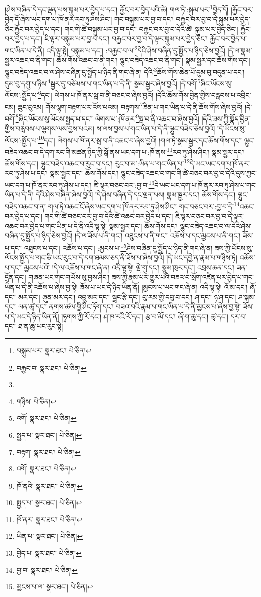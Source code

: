 །ཤེས་བཞིན་དེ་དང་ལྡན་པས་སྐུམ་པར་བྱེད་པ་དང་། རྐྱོང་བར་བྱེད་པའི་ཚེ། གལ་ཏེ་:སྐུམ་པར་\footnote{བསྐུམ་པར་  སྣར་ཐང་།  པེ་ཅིན། }བྱེད་དོ། །རྐྱོང་བར་བྱེད་དོ་ཞེས་ཡང་དག་པ་ཁོ་ནར་རབ་ཏུ་ཤེས་ཤིང་། གང་བསྐུམ་པར་བྱ་བ་དང་། བརྐྱང་བར་བྱ་བ་དེ་སྐུམ་པར་བྱེད་ཅིང་རྐྱོང་བར་བྱེད་པ་དང་། གང་གི་ཚེ་བསྐུམ་པར་བྱ་བ་དང་། བརྐྱང་བར་བྱ་བ་དེའི་ཚེ། སྐུམ་པར་བྱེད་ཅིང་། རྐྱོང་བར་བྱེད་པ་དང་། ཇི་ལྟར་བསྐུམ་པར་བྱ་བ་དང་། བརྐྱང་བར་བྱ་བ་དེ་ལྟར་སྐུམ་པར་བྱེད་ཅིང་། རྐྱོང་བར་བྱེད་པ་གང་ཡིན་པ་དེ་ནི། འདི་ལྟ་སྟེ། བསྐུམ་པ་དང་། :བརྐྱང་བ་ལ་\footnote{བརྐྱང་བ་  སྣར་ཐང་།  པེ་ཅིན། }དེའི་ཤེས་བཞིན་དུ་སྤྱོད་པ་ཉིད་ཅེས་བྱའོ། །དེ་ལ་སྣམ་སྦྱར་འཆང་བ་ནི་གང་། ཆོས་གོས་འཆང་བ་ནི་གང་། ལྷུང་བཟེད་འཆང་བ་ནི་གང་། སྣམ་སྦྱར་དང་ཆོས་གོས་དང་། ལྷུང་བཟེད་འཆང་བ་ལ་ཤེས་བཞིན་དུ་སྤྱོད་པ་ཉིད་ནི་གང་ཞེ་ན། དེའི་\footnote{}ཆོས་གོས་ཆེན་པོ་དུམ་བུ་བདུན་པ་དང་། དུམ་བུ་དགུ་པ་ཉིས་\footnote{གཉིས་  པེ་ཅིན། }སྦྱར་དུ་བཙེམས་པ་གང་ཡིན་པ་དེ་ནི། སྣམ་སྦྱར་ཞེས་བྱའོ། །དེ་བགོ་\footnote{འགོ་  སྣར་ཐང་།  པེ་ཅིན། }ཞིང་ཡོངས་སུ་ལོངས་:སྤྱོད་པ་\footnote{སྤྱད་པ་  སྣར་ཐང་།  པེ་ཅིན། }དང་། ལེགས་པ་ཁོ་ནར་སྦ་བ་ནི་བཅང་བ་ཞེས་བྱའོ། །དེའི་ཆོས་གོས་བྱིན་གྱིས་བརླབས་པ་འབྲིང་ངམ། ཆུང་ངུའམ། གོས་ལྷག་བརྟག་པར་འོས་པའམ། བརྟགས་\footnote{བརྟག་  སྣར་ཐང་།  པེ་ཅིན། }ཟིན་པ་གང་ཡིན་པ་དེ་ནི་ཆོས་གོས་ཞེས་བྱའོ། །དེ་བགོ་\footnote{འགོ་  སྣར་ཐང་།  པེ་ཅིན། }ཞིང་ཡོངས་སུ་ལོངས་སྤྱད་པ་དང་། ལེགས་པ་:ཁོ་ནར་\footnote{ཁོ་ནའི་  སྣར་ཐང་།  པེ་ཅིན། }སྦ་བ་ནི་འཆང་བ་ཞེས་བྱའོ། །དེའི་ཟས་ཀྱི་སྣོད་བྱིན་གྱིས་བརླབས་པ་ལྕགས་ལས་བྱས་པའམ། ས་ལས་བྱས་པ་གང་ཡིན་པ་དེ་ནི་ལྷུང་བཟེད་ཅེས་བྱའོ། །དེ་ཡོངས་སུ་ལོངས་:སྤྱོད་པ་\footnote{སྤྱད་པ་  སྣར་ཐང་།  པེ་ཅིན། }དང་། ལེགས་པ་ཁོ་ནར་སྦ་བ་ནི་འཆང་བ་ཞེས་བྱའོ། །གལ་ཏེ་སྣམ་སྦྱར་དང་ཆོས་གོས་དང་། ལྷུང་བཟེད་འཆང་བ་དེ་དག་རང་གི་མཚན་ཉིད་ཀྱི་སྒོ་ནས་ཡང་དག་པ་:ཁོ་ནས་\footnote{ཁོ་ནར་  སྣར་ཐང་།  པེ་ཅིན། }རབ་ཏུ་ཤེས་ཤིང་། སྣམ་སྦྱར་དང་། ཆོས་གོས་དང་། ལྷུང་བཟེད་འཆང་བ་རུང་བ་དང་། རུང་བ་མ་:ཡིན་པ་གང་ཡིན་པ་\footnote{ཡིན་པ་  སྣར་ཐང་།  པེ་ཅིན། }དེ་ཡང་ཡང་དག་པ་ཁོ་ནར་རབ་ཏུ་ཤེས་པ་དང་། སྣམ་སྦྱར་དང་། ཆོས་གོས་དང་། ལྷུང་བཟེད་འཆང་བ་གང་གི་ཚེ་བཅང་བར་བྱ་བ་དེའི་དུས་ཀྱང་ཡང་དག་པ་ཁོ་ནར་རབ་ཏུ་ཤེས་པ་དང་། ཇི་ལྟར་བཅང་བར་:བྱ་བ་\footnote{བྱེད་པ་  སྣར་ཐང་།  པེ་ཅིན། }དེ་ཡང་ཡང་དག་པ་ཁོ་ནར་རབ་ཏུ་ཤེས་པ་གང་ཡིན་པ་དེ་ནི། དེའི་ཤེས་བཞིན་ཞེས་བྱའོ། །དེ་ཤེས་བཞིན་དེ་དང་ལྡན་པས། སྣམ་སྦྱར་དང་། ཆོས་གོས་དང་། ལྷུང་བཟེད་འཆང་བ་ན། གལ་ཏེ་འཆང་ངོ་ཞེས་ཡང་དག་པ་ཁོ་ནར་རབ་ཏུ་ཤེས་ཤིང་། གང་བཅང་བར་:བྱ་བ་དེ་\footnote{བྱ་བ་  སྣར་ཐང་།  པེ་ཅིན། }འཆང་བར་བྱེད་པ་དང་། གང་གི་ཚེ་བཅང་བར་བྱ་བ་དེའི་ཚེ་འཆང་བར་བྱེད་པ་དང་། ཇི་ལྟར་བཅང་བར་བྱ་བ་དེ་ལྟར་འཆང་བར་བྱེད་པ་གང་ཡིན་པ་དེ་ནི་འདི་ལྟ་སྟེ། སྣམ་སྦྱར་དང་། ཆོས་གོས་དང་། ལྷུང་བཟེད་འཆང་བ་ལ་དེའི་ཤེས་བཞིན་དུ་སྤྱོད་པ་ཉིད་ཅེས་བྱའོ། །དེ་ལ་ཟོས་པ་ནི་གང་། འཐུངས་པ་ནི་གང་། འཆོས་པ་དང་མྱངས་པ་ནི་གང་། ཟོས་པ་དང་། འཐུངས་པ་དང་། འཆོས་པ་དང་། :མྱངས་པ་\footnote{མྱངས་པ་ལ་  སྣར་ཐང་།  པེ་ཅིན། }ཤེས་བཞིན་དུ་སྤྱོད་པ་ཉིད་ནི་གང་ཞེ་ན། ཟས་ཀྱི་ཡོངས་སུ་ལོངས་སྤྱོད་པ་གང་ཅི་ཡང་རུང་བ་དེ་དག་ཐམས་ཅད་ནི་ཟོས་པ་ཞེས་བྱའོ། །དེ་ཡང་དབྱེ་ན་རྣམ་པ་གཉིས་ཏེ། འཆོས་པ་དང་། མྱངས་པའོ། །དེ་ལ་འཆོས་པ་གང་ཞེ་ན། འདི་ལྟ་སྟེ། ལྡེ་གུ་དང་། སྣུམ་ཁུར་དང་། འབྲས་ཆན་དང་། ཟན་དྲོན་དང་། གཞན་ཡང་གང་གཡོས་སུ་བྱས་ཤིང་། ཟས་ཀྱི་རྣམ་པར་གྱུར་པའི་བཟའ་བ་སྲོག་འཛིན་པར་བྱེད་པ་གང་ཡིན་པ་དེ་ནི་འཆོས་པ་ཞེས་བྱ་སྟེ། ཟོས་པ་ཡང་དེ་ཉིད་ཡིན་ནོ། །མྱངས་པ་ཡང་གང་ཞེ་ན། འདི་ལྟ་སྟེ། འོ་མ་དང་། ཞོ་དང་། མར་དང་། ཞུན་མར་དང་། འབྲུ་མར་དང་། སྦྲང་རྩི་དང་། བུ་རམ་གྱི་དབུ་བ་དང་། ཤ་དང་། ཉ་ཤ་དང་། ཤ་སྐམ་དང་། ལན་ཚྭ་དང་། ནགས་ཚལ་གྱི་ཤིང་ཏོག་དང་། བཟའ་བའི་རྣམ་པ་གང་ཡིན་པ་དེ་ནི་མྱངས་པ་ཞེས་བྱ་སྟེ། ཟོས་པ་དེ་ཡང་དེ་ཉིད་ཡིན་ནོ། །ཧྭགས་ཀྱི་རོ་དང་། ཤ་ཁ་རའི་རོ་དང་། རྩ་བ་མོ་དང་། ཞོ་ག་ཆུ་དང་། ཚྭ་དང་། དར་བ་དང་། ཐ་ན་ཆུ་ཡང་རུང་སྟེ། 